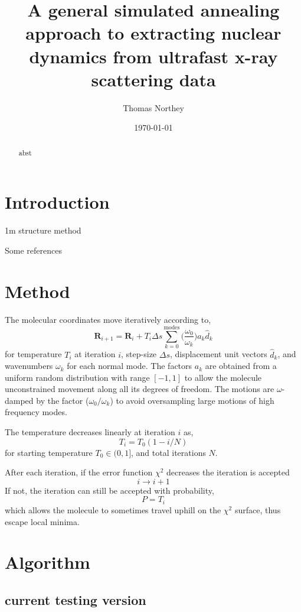 \documentclass[]{article}
\title{A general simulated annealing approach to extracting nuclear dynamics from ultrafast x-ray scattering data}
\author{Thomas Northey}
\date{\today}
\begin{document}
	
	\maketitle
	
	\begin{abstract}
		abst
	\end{abstract}
	
	\section{Introduction}
	1m structure method \cite{yong2021determination}
	
	Some references \cite{yong2019scattering,yong2021determination,stankus2019ultrafast,wolf2019photochemical,moreno2019ab,northey2014ab,northey2016elastic}
	
	\section{Method}
	
	The molecular coordinates move iteratively according to,
	\[
	\textbf{R}_{i+1} = \textbf{R}_{i} + T_i\Delta s\sum_{k=0}^{\textrm{modes}} \Big(\frac{\omega_0}{\omega_k}\Big) a_k\hat{d}_k
	\]
	for temperature $T_i$ at iteration $i$, step-size $\Delta s$, displacement unit vectors $\hat{d}_k$, and wavenumbers $\omega_k$ for each normal mode. The factors $a_k$ are obtained from a uniform random distribution with range $[-1, 1]$ to allow the molecule unconstrained movement along all its degrees of freedom.
	The motions are $\omega$-damped by the factor (${\omega_0}/{\omega_k}$) to avoid oversampling large motions of high frequency modes.
	
	The temperature decreases linearly at iteration $i$ as,
	\[
	T_i = T_0(1 - i / N)
	\]
	for starting temperature $T_0\in(0, 1]$, and total iterations $N$.
	
	After each iteration, if the error function $\chi^2$ decreases the iteration is accepted
	\[
	i\rightarrow i+1
	\]
	If not, the iteration can still be accepted with probability,
	\[
	P = T_i
	\]
	which allows the molecule to sometimes travel uphill on the $\chi^2$ surface, thus escape local minima.
	
	\section{Algorithm}
	
	\subsection{current testing version}
	
\end{document}
